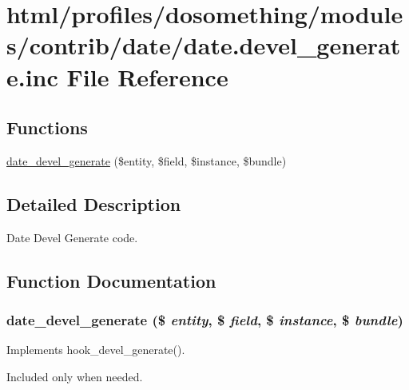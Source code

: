 \hypertarget{date_8devel__generate_8inc}{
\section{html/profiles/dosomething/modules/contrib/date/date.devel\_\-generate.inc File Reference}
\label{date_8devel__generate_8inc}
}
\subsection*{Functions}
\begin{DoxyCompactItemize}
\item 
\hyperlink{date_8devel__generate_8inc_a3e66e5d5e35b3bff6ed84dedbcc12a59}{date\_\-devel\_\-generate} (\$entity, \$field, \$instance, \$bundle)
\end{DoxyCompactItemize}


\subsection{Detailed Description}
Date Devel Generate code. 

\subsection{Function Documentation}
\hypertarget{date_8devel__generate_8inc_a3e66e5d5e35b3bff6ed84dedbcc12a59}{
\subsubsection[{date\_\-devel\_\-generate}]{\setlength{\rightskip}{0pt plus 5cm}date\_\-devel\_\-generate (\$ {\em entity}, \/  \$ {\em field}, \/  \$ {\em instance}, \/  \$ {\em bundle})}}
\label{date_8devel__generate_8inc_a3e66e5d5e35b3bff6ed84dedbcc12a59}
Implements hook\_\-devel\_\-generate().

Included only when needed. 